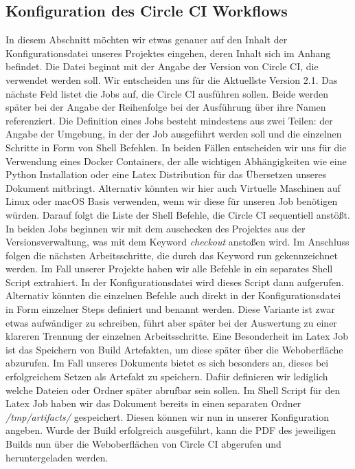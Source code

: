 \documentclass[11pt]{article}
\begin{document}
\subsection{Konfiguration des Circle CI Workflows}
In diesem Abschnitt möchten wir etwas genauer auf den Inhalt der Konfigurationsdatei unseres Projektes eingehen, deren Inhalt sich im Anhang befindet. Die Datei beginnt mit der Angabe der Version von Circle CI, die verwendet werden soll. Wir entscheiden uns für die Aktuellste Version 2.1. Das nächste Feld listet die Jobs auf, die Circle CI ausführen sollen. Beide werden später bei der Angabe der Reihenfolge bei der Ausführung über ihre Namen referenziert. Die Definition eines Jobs besteht mindestens aus zwei Teilen: der Angabe der Umgebung, in der der Job ausgeführt werden soll und die einzelnen Schritte in Form von Shell Befehlen. In beiden Fällen entscheiden wir uns für die Verwendung eines Docker Containers, der alle wichtigen Abhängigkeiten wie eine Python Installation oder eine Latex Distribution für das Übersetzen unseres Dokument mitbringt. Alternativ könnten wir hier auch Virtuelle Maschinen auf Linux oder macOS Basis verwenden, wenn wir diese für unseren Job benötigen würden.
Darauf folgt die Liste der Shell Befehle, die Circle CI sequentiell anstößt. In beiden Jobs beginnen wir mit dem auschecken des Projektes aus der Versionsverwaltung, was mit dem Keyword \textit{checkout} anstoßen wird. Im Anschluss folgen die nächsten Arbeitsschritte, die durch das Keyword run gekennzeichnet werden. Im Fall unserer Projekte haben wir alle Befehle in ein separates Shell Script extrahiert. In der Konfigurationsdatei wird dieses Script dann aufgerufen. Alternativ könnten die einzelnen Befehle auch direkt in der Konfigurationsdatei in Form einzelner Steps definiert und benannt werden. Diese Variante ist zwar etwas aufwändiger zu schreiben, führt aber später bei der Auswertung zu einer klareren Trennung der einzelnen Arbeitsschritte.
Eine Besonderheit im Latex Job ist das Speichern von Build Artefakten, um diese später über die Weboberfläche abzurufen. Im Fall unseres Dokuments bietet es sich besonders an, dieses bei erfolgreichem Setzen als Artefakt zu speichern. Dafür definieren wir lediglich welche Dateien oder Ordner später abrufbar sein sollen. Im Shell Script für den Latex Job haben wir das Dokument bereits in einen separaten Ordner \textit{/tmp/artifacts/} gespeichert. Diesen können wir nun in unserer Konfiguration angeben. Wurde der Build erfolgreich ausgeführt, kann die PDF des jeweiligen Builds nun über die Weboberflächen von Circle CI abgerufen und heruntergeladen werden.
\end{document}

